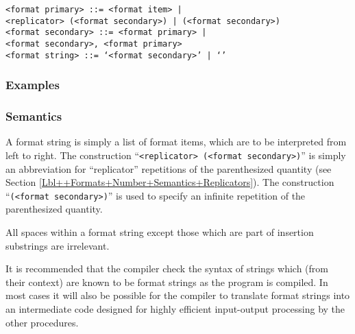 \documentclass[a4paper,11pt]{article}
\begin{document}
\begin{flushleft}
\vspace{0.2em}\texttt{<format primary> ::= <format item> |\\
  \hspace{1.0cm}<replicator> (<format secondary>) | (<format secondary>)}\\

\vspace{0.2em}\texttt{<format secondary> ::= <format primary> |\\
  \hspace{1.0cm}<format secondary>, <format primary>}\\

\vspace{0.2em}\texttt{<format string> ::= `<format secondary>' | `'}\\
\end{flushleft}

\subsubsection{Examples}


\subsubsection{Semantics}

A format string is simply a list of format items, which are to be
interpreted from left to right.  The construction ``{\tt <replicator>
(<format secondary>)}'' is simply an abbreviation for ``replicator''
repetitions of the parenthesized quantity (see Section
\ref{Lbl++Formats+Number+Semantics+Replicators}).  The construction
``{\tt (<format secondary>)}'' is used to specify an infinite
repetition of the parenthesized quantity.

All spaces within a format string except those which are part of
insertion substrings are irrelevant.

It is recommended that the \Algol compiler check the syntax of strings
which (from their context) are known to be format strings as the
program is compiled.  In most cases it will also be possible for the
compiler to translate format strings into an intermediate code
designed for highly efficient input-output processing by the other
procedures.
\end{document}
